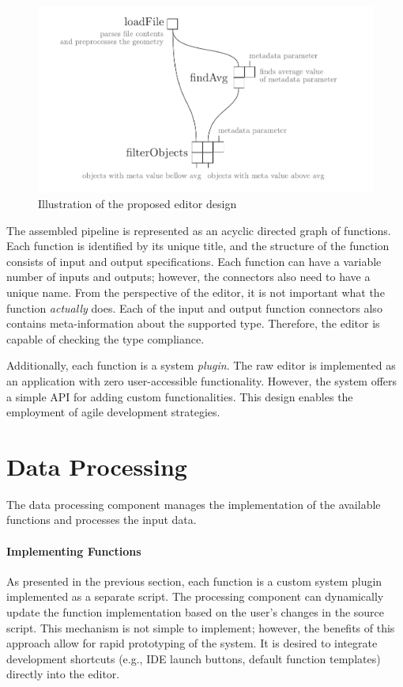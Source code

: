 \begin{figure}[h]
    \centering
    \includegraphics[width=\linewidth]{figures/editor.pdf}
    \caption{Illustration of the proposed editor design}
    \label{fig:editor}
\end{figure}

The assembled pipeline is represented as an acyclic directed graph of functions. Each function is identified by its unique title, and the structure of the function consists of input and output specifications. Each function can have a variable number of inputs and outputs; however, the connectors also need to have a unique name. From the perspective of the editor, it is not important what the function \textit{actually} does. Each of the input and output function connectors also contains meta-information about the supported type. Therefore, the editor is capable of checking the type compliance.    

Additionally, each function is a system \textit{plugin}. The raw editor is implemented as an application with zero user-accessible functionality. However, the system offers a simple API for adding custom functionalities. This design enables the employment of agile development strategies. 

\section{Data Processing}
The data processing component manages the implementation of the available functions and processes the input data. 

\paragraph{Implementing Functions} As presented in the previous section, each function is a custom system plugin implemented as a separate script. The processing component can dynamically update the function implementation based on the user's changes in the source script. This mechanism is not simple to implement; however, the benefits of this approach allow for rapid prototyping of the system. It is desired to integrate development shortcuts (e.g., IDE launch buttons, default function templates) directly into the editor.  


